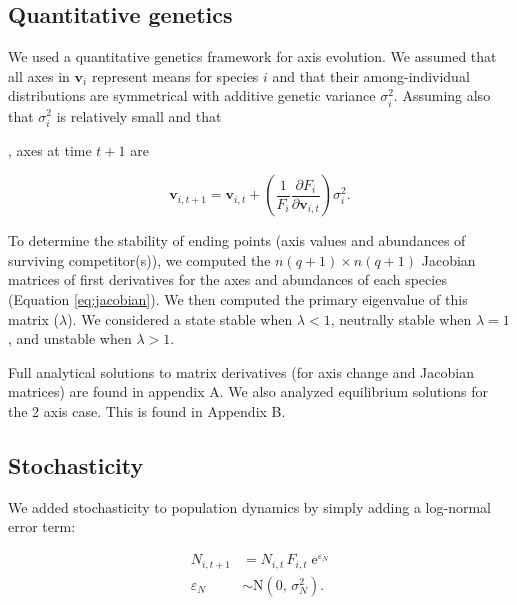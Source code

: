 \subsection*{Quantitative genetics}

We used a quantitative genetics framework for axis evolution.
We assumed that all axes in $\mathbf{v}_i$ represent means for species $i$
and that their among-individual distributions are symmetrical with additive
genetic variance $\sigma^2_i$.
Assuming also that $\sigma^2_i$ is relatively small
\citep{Iwasa1991a,Abrams2001a,Abrams1993b} and that

\cite{DeVries2019}


, axes at time $t+1$ are

\begin{equation} \label{eq:axis-change}
    \mathbf{v}_{i,t+1} = \mathbf{v}_{i,t} + \left( \frac{1}{F_i}
        \frac{\partial F_i}{\partial \mathbf{v}_{i,t}} \right) \sigma^2_i
    \textrm{.}
\end{equation}

To determine the stability of ending points (axis values and abundances of
surviving competitor(s)), we computed the $n (q+1) \times n (q+1)$ Jacobian matrices
of first derivatives for the axes and abundances of each species (Equation \ref{eq:jacobian}).
We then computed the primary eigenvalue of this matrix ($\lambda$).
We considered a state stable when $\lambda < 1$,
neutrally stable when $\lambda = 1$,
and unstable when $\lambda > 1$.

Full analytical solutions to matrix derivatives (for axis change and
Jacobian matrices) are found in appendix A.
We also analyzed equilibrium solutions for the 2 axis case.
This is found in Appendix B.


\subsection*{Stochasticity}

We added stochasticity to population dynamics by simply adding 
a log-normal error term:

\begin{equation} \label{eq:N-stochasticity}
\begin{split}
    N_{i,t+1} &= N_{i,t} \, F_{i,t} \; \text{e}^{\varepsilon_N} \\
    \varepsilon_N &\sim \text{N}(0, \, \sigma^2_N)
    \text{.}
\end{split}
\end{equation}



